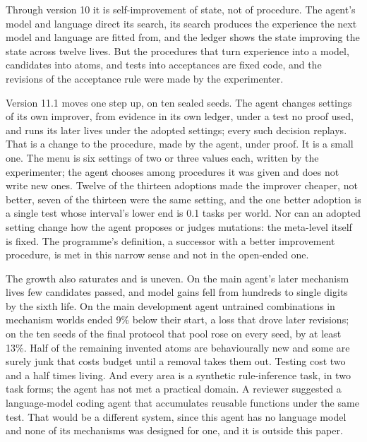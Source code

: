 \documentclass[11pt]{article}
\begin{document}
Through version 10 it is self-improvement of state, not of procedure. The agent's model and language direct its search, its search produces the experience the next model and language are fitted from, and the ledger shows the state improving the state across twelve lives. But the procedures that turn experience into a model, candidates into atoms, and tests into acceptances are fixed code, and the revisions of the acceptance rule were made by the experimenter.

Version 11.1 moves one step up, on ten sealed seeds. The agent changes settings of its own improver, from evidence in its own ledger, under a test no proof used, and runs its later lives under the adopted settings; every such decision replays. That is a change to the procedure, made by the agent, under proof. It is a small one. The menu is six settings of two or three values each, written by the experimenter; the agent chooses among procedures it was given and does not write new ones. Twelve of the thirteen adoptions made the improver cheaper, not better, seven of the thirteen were the same setting, and the one better adoption is a single test whose interval's lower end is 0.1 tasks per world. Nor can an adopted setting change how the agent proposes or judges mutations: the meta-level itself is fixed. The programme's definition, a successor with a better improvement procedure, is met in this narrow sense and not in the open-ended one.

The growth also saturates and is uneven. On the main agent's later mechanism lives few candidates passed, and model gains fell from hundreds to single digits by the sixth life. On the main development agent untrained combinations in mechanism worlds ended 9\% below their start, a loss that drove later revisions; on the ten seeds of the final protocol that pool rose on every seed, by at least 13\%. Half of the remaining invented atoms are behaviourally new and some are surely junk that costs budget until a removal takes them out. Testing cost two and a half times living. And every area is a synthetic rule-inference task, in two task forms; the agent has not met a practical domain. A reviewer suggested a language-model coding agent that accumulates reusable functions under the same test. That would be a different system, since this agent has no language model and none of its mechanisms was designed for one, and it is outside this paper.
\end{document}
